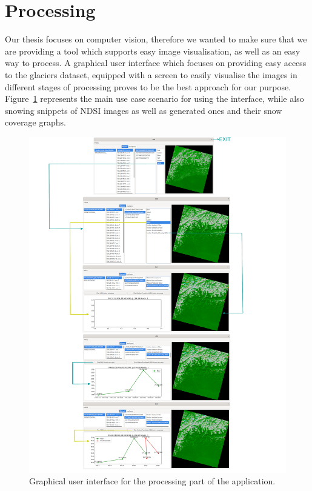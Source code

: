 \documentclass[12pt, a4paper]{report}
\begin{document}
	\section{Processing}
	\label{sec:processing_gui}
	
	\par Our thesis focuses on computer vision, therefore we wanted to make sure that we are providing a tool which supports easy image visualisation, as well as an easy way to process. A graphical user interface which focuses on providing easy access to the glaciers dataset, equipped with a screen to easily visualise the images in different stages of processing proves to be the best approach for our purpose. Figure~\ref{fig:gui} represents the main use case scenario for using the interface, while also snowing snippets of NDSI images as well as generated ones and their snow coverage graphs.
	
	\begin{figure}[h!]
		\centering
		\includegraphics[width=\columnwidth]{../images/GUI.png}
		\caption{Graphical user interface for the processing part of the application.}
		\label{fig:gui}
	\end{figure}
\end{document}
